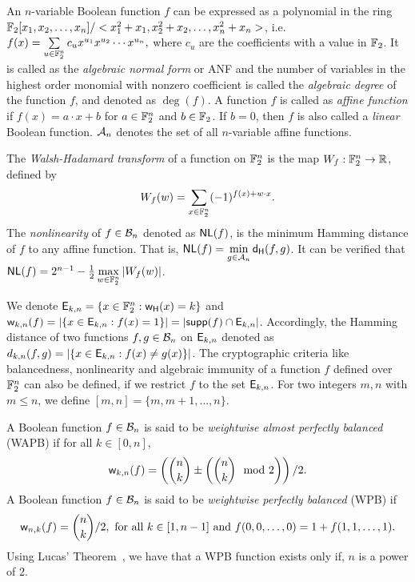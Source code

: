 \documentclass{llncs}
\begin{document}
An $n$-variable Boolean function $f$ can be expressed as a polynomial in the ring $\mathbb{F}_2[x_1,x_2,\ldots,x_n]/<x_1^2+x_1,x_2^2+x_2,\ldots,x_n^2+x_n>$, i.e. 
$f(x) = \sum\limits_{u \in \mathbb{F}_2^n}c_u x^{u_1}x^{u_2}\cdots x^{u_n},$
where $c_u$ are the coefficients with a value in $\mathbb{F}_2$.
It is called as the {\em algebraic normal form} or ANF and the number of variables in the highest order monomial with nonzero coefficient is called the {\em algebraic degree} of the function $f$, and denoted as $\deg(f)$.
A function $f$ is called as {\em affine function} if $f(x)= a\cdot x + b$ for $a \in \mathbb{F}_2^n$ and $b \in \mathbb{F}_2$. If $b=0$, then $f$ is also called a {\em linear} Boolean function. $\mathcal{A}_n$ denotes the set of all $n$-variable affine functions. 

The {\em Walsh-Hadamard transform} of a function on $\mathbb{F}_2^n$ is the map $W_f : \mathbb{F}_2^n \to \mathbb{R}$, defined by 
\[W_{f}(w)= \sum_{x \in \mathbb{F}_2^n} (-1)^{f(x)+ w \cdot x}.\]
The {\em nonlinearity} of $f \in \mathcal{B}_n$ denoted as $\mathsf{NL}(f)$, is the minimum Hamming distance of $f$ to any affine function. That is, $\mathsf{NL}(f) = \min\limits_{g \in \mathcal{A}_n} \mathsf{d_H}(f,g)$.
It can be verified that $\mathsf{NL}(f) = 2^{n-1} - \frac{1}{2}\max\limits_{w \in \mathbb{F}_2^n} |W_{f}(w)|$.

We denote $\mathsf{E}_{k,n} = \{x \in \mathbb{F}_2^n : \mathsf{w_H}(x)=k\}$ and $\mathsf{w}_{k,n}(f) = |\{x \in \mathsf{E}_{k,n} : f(x) = 1 \}| = |\mathsf{supp}(f) \cap \mathsf{E}_{k,n}|$. Accordingly, the Hamming distance of two functions $f, g \in \mathcal{B}_n$ on $\mathsf{E}_{k,n}$ denoted as $d_{k,n}(f,g) = |\{x \in \mathsf{E}_{k,n} : f(x) \neq g(x)\}|$. The cryptographic criteria like balancedness, nonlinearity and algebraic immunity of a function $f$ defined over $\mathbb{F}_2^n$ can also be defined, if we restrict $f$ to the set $\mathsf{E}_{k,n}$. For two integers $m, n$ with $m \leq n$, we define $[m,n] = \{m, m+1, \ldots, n\}$.

A Boolean function $f \in \mathcal{B}_n$ is said to be {\em weightwise almost perfectly balanced} (WAPB) if for all $k \in [0,n]$, 
\[\mathsf{w}_{k,n}(f)= \left({n\choose k} \pm \left({n \choose k} \mod 2\right)\right) /2.\]
A Boolean function $f \in \mathcal{B}_n$ is said to be {\em weightwise perfectly balanced} (WPB) if  
\[\mathsf{w}_{n,k}(f) = {n \choose k}/2, \text{ for all }k \in [1,n-1] \text{ and } f(0,0,\ldots,0) = 1+f(1,1,\ldots,1).\]
Using Lucas' Theorem~\cite{LucasTh}, we have that a WPB function exists only if, $n$ is a power of $2$.
\end{document}
